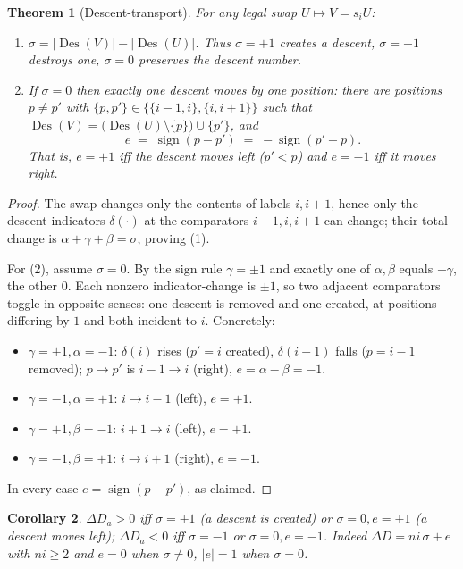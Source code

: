 \documentclass[11pt]{article}
\theoremstyle{plain}
\newtheorem{theorem}{Theorem}
\newtheorem{corollary}[theorem]{Corollary}
\theoremstyle{definition}
\theoremstyle{remark}
\newcommand{\Des}{\operatorname{Des}}
\newcommand{\dD}{\Delta D}
\begin{document}
\begin{theorem}[Descent-transport]\label{thm:transport}
For any legal swap $U\mapsto V=s_iU$:
\begin{enumerate}
\item $\sigma=|\Des(V)|-|\Des(U)|$. Thus $\sigma=+1$ creates a descent, $\sigma=-1$
destroys one, $\sigma=0$ preserves the descent number.
\item If $\sigma=0$ then exactly one descent moves by one position: there are positions
$p\ne p'$ with $\{p,p'\}\in\{\{i{-}1,i\},\{i,i{+}1\}\}$ such that
$\Des(V)=\big(\Des(U)\setminus\{p\}\big)\cup\{p'\}$, and
\[
e \;=\; \operatorname{sign}(p-p')\;=\;-\operatorname{sign}(p'-p).
\]
That is, $e=+1$ iff the descent moves left ($p'<p$) and $e=-1$ iff it moves right.
\end{enumerate}
\end{theorem}
\begin{proof}
The swap changes only the contents of labels $i,i{+}1$, hence only the descent indicators
$\delta(\cdot)$ at the comparators $i{-}1,i,i{+}1$ can change; their total change is
$\alpha+\gamma+\beta=\sigma$, proving (1).

For (2), assume $\sigma=0$. By the sign rule $\gamma=\pm1$ and exactly one of
$\alpha,\beta$ equals $-\gamma$, the other $0$. Each nonzero indicator-change is $\pm1$, so
two adjacent comparators toggle in opposite senses: one descent is removed and one created,
at positions differing by $1$ and both incident to $i$. Concretely:
\begin{itemize}
\item $\gamma=+1,\alpha=-1$: $\delta(i)$ rises ($p'=i$ created), $\delta(i{-}1)$ falls
($p=i{-}1$ removed); $p\to p'$ is $i{-}1\to i$ (right), $e=\alpha-\beta=-1$.
\item $\gamma=-1,\alpha=+1$: $i\to i{-}1$ (left), $e=+1$.
\item $\gamma=+1,\beta=-1$: $i{+}1\to i$ (left), $e=+1$.
\item $\gamma=-1,\beta=+1$: $i\to i{+}1$ (right), $e=-1$.
\end{itemize}
In every case $e=\operatorname{sign}(p-p')$, as claimed.
\end{proof}

\begin{corollary}\label{cor:dDsign}
$\dD_a>0$ iff $\sigma=+1$ (a descent is created) or $\sigma=0,e=+1$ (a descent moves left);
$\dD_a<0$ iff $\sigma=-1$ or $\sigma=0,e=-1$. Indeed $\dD=ni\,\sigma+e$ with $ni\ge2$ and
$e=0$ when $\sigma\ne0$, $|e|=1$ when $\sigma=0$.
\end{corollary}
\end{document}
